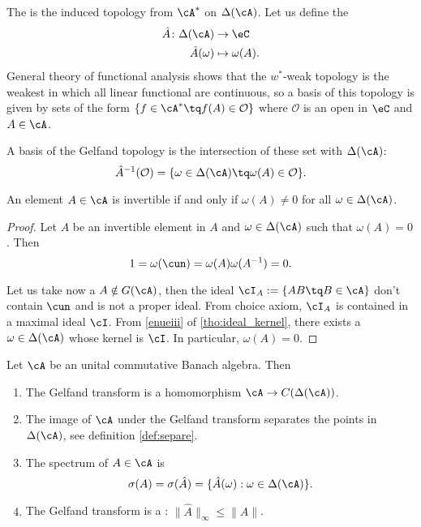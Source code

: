 The  is the induced topology from $\cA^*$ on $\Delta(\cA)$. Let us define the 
        \begin{equation}
        \begin{aligned}
            \hat A \colon \Delta(\cA) &\to \eC\\
            \hat A(\omega)&\mapsto \omega(A).
        \end{aligned}
    \end{equation}  
General theory of functional analysis shows that the $w^*$-weak topology is the weakest in which all linear functional are continuous, so a basis of this topology is given by sets of the form $\{f\in\cA^*\tq f(A)\in\mathcal{O}\}$ where $\mathcal{O}$ is an open in $\eC$ and $A\in\cA$.

A basis of the Gelfand topology is the intersection of these set with $\Delta(\cA)$:
\begin{equation}
  \hat A^{-1}(\mathcal{O})=\{\omega\in\Delta(\cA)\tq \omega(A)\in\mathcal{O}\}.
\end{equation}



\begin{lemma}
An element $A\in\cA$ is invertible if and only if $\omega(A)\neq0$ for all $\omega\in\Delta(\cA)$.
\end{lemma}


\begin{proof}
Let $A$ be an invertible element in $A$ and $\omega\in\Delta(\cA)$ such that $\omega(A)=0$. Then 
\[
  1=\omega(\cun)=\omega(A)\omega(A^{-1})=0.
\]

Let us take now a $A\notin G(\cA)$, then the ideal $\cI_A:=\{AB\tq B\in\cA\}$ don't contain $\cun$ and is not a proper ideal. From choice axiom, $\cI_A$ is contained in a maximal ideal $\cI$. From \ref{enueiii} of \ref{tho:ideal_kernel}, there exists a $\omega\in\Delta(\cA)$ whose kernel is $\cI$. In particular, $\omega(A)=0$.
\end{proof}

\begin{theorem}
Let $\cA$ be an unital commutative Banach algebra. Then
\begin{enumerate}
\item The Gelfand transform is a homomorphism $\cA\to C(\Delta(\cA))$. \label{enugi}
\item The image of $\cA$ under the Gelfand transform separates the points in $\Delta(\cA)$, see definition \ref{def:separe}. \label{enugii}
\item \label{enugiii} The spectrum of $A\in\cA$ is 
\[
   \sigma(A)=\sigma(\hat A)=\{\hat A(\omega):\omega\in\Delta(\cA)\}.
\]
\item \label{enugiv} The Gelfand transform is a :   $\|\hat A\|_{\infty}\leq\|A\|$.
\end{enumerate}\label{tho:unital_comm}
\end{theorem}

